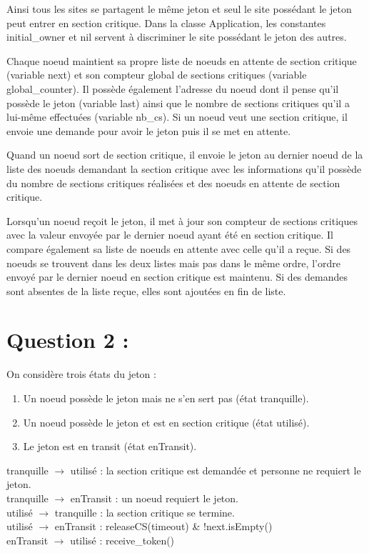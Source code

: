 \documentclass[11pt,a4paper]{report}
\begin{document}
Ainsi tous les sites se partagent le même jeton et seul le site possédant le jeton peut entrer en section critique. Dans la classe Application, les constantes initial\_owner et nil servent à discriminer le site possédant le jeton des autres.

Chaque noeud maintient sa propre liste de noeuds en attente de section critique (variable next) et son compteur global de sections critiques (variable global\_counter). Il possède également l'adresse du noeud dont il pense qu'il possède le jeton (variable last) ainsi que le nombre de sections critiques qu'il a lui-même effectuées (variable nb\_cs). Si un noeud veut une section critique, il envoie une demande pour avoir le jeton puis il se met en attente.

Quand un noeud sort de section critique, il envoie le jeton au dernier noeud de la liste des noeuds demandant la section critique avec les informations qu'il possède du nombre de sections critiques réalisées et des noeuds en attente de section critique.

Lorsqu'un noeud reçoit le jeton, il met à jour son compteur de sections critiques avec la valeur envoyée par le dernier noeud ayant été en section critique. Il compare également sa liste de noeuds en attente avec celle qu'il a reçue. Si des noeuds se trouvent dans les deux listes mais pas dans le même ordre, l'ordre envoyé par le dernier noeud en section critique est maintenu. Si des demandes sont absentes de la liste reçue, elles sont ajoutées en fin de liste.


\section{Question 2 :}

On considère trois états du jeton :
\begin{enumerate}
	\item Un noeud possède le jeton mais ne s’en sert pas (état tranquille).
	\item Un noeud possède le jeton et est en section critique (état utilisé).
	\item Le jeton est en transit (état enTransit).
\end{enumerate}

tranquille $\rightarrow$ utilisé : la section critique est demandée et personne ne requiert le jeton.\\
tranquille $\rightarrow$ enTransit : un noeud requiert le jeton.\\
utilisé $\rightarrow$ tranquille : la section critique se termine.\\
utilisé $\rightarrow$ enTransit : releaseCS(timeout) \& !next.isEmpty()\\
enTransit $\rightarrow$ utilisé : receive\_token()\\
\end{document}
